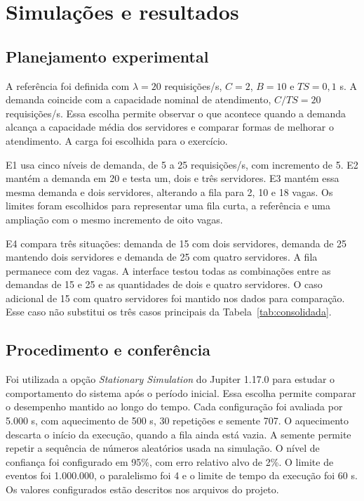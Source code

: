 \documentclass[10pt]{ieeeconf}
\begin{document}
\section{Simulações e resultados}
\subsection{Planejamento experimental}
A referência foi definida com $\lambda=20$ requisições/s, $C=2$, $B=10$ e $TS=0{,}1$ s. A demanda coincide com a capacidade nominal de atendimento, $C/TS=20$ requisições/s. Essa escolha permite observar o que acontece quando a demanda alcança a capacidade média dos servidores e comparar formas de melhorar o atendimento. A carga foi escolhida para o exercício.

E1 usa cinco níveis de demanda, de 5 a 25 requisições/s, com incremento de 5. E2 mantém a demanda em 20 e testa um, dois e três servidores. E3 mantém essa mesma demanda e dois servidores, alterando a fila para 2, 10 e 18 vagas. Os limites foram escolhidos para representar uma fila curta, a referência e uma ampliação com o mesmo incremento de oito vagas.

E4 compara três situações: demanda de 15 com dois servidores, demanda de 25 mantendo dois servidores e demanda de 25 com quatro servidores. A fila permanece com dez vagas. A interface testou todas as combinações entre as demandas de 15 e 25 e as quantidades de dois e quatro servidores. O caso adicional de 15 com quatro servidores foi mantido nos dados para comparação. Esse caso não substitui os três casos principais da Tabela~\ref{tab:consolidada}.

\subsection{Procedimento e conferência}
Foi utilizada a opção \textit{Stationary Simulation} do Jupiter 1.17.0 para estudar o comportamento do sistema após o período inicial. Essa escolha permite comparar o desempenho mantido ao longo do tempo. Cada configuração foi avaliada por 5.000 s, com aquecimento de 500 s, 30 repetições e semente 707. O aquecimento descarta o início da execução, quando a fila ainda está vazia. A semente permite repetir a sequência de números aleatórios usada na simulação. O nível de confiança foi configurado em 95\%, com erro relativo alvo de 2\%. O limite de eventos foi 1.000.000, o paralelismo foi 4 e o limite de tempo da execução foi 60 s. Os valores configurados estão descritos nos arquivos do projeto.
\end{document}
